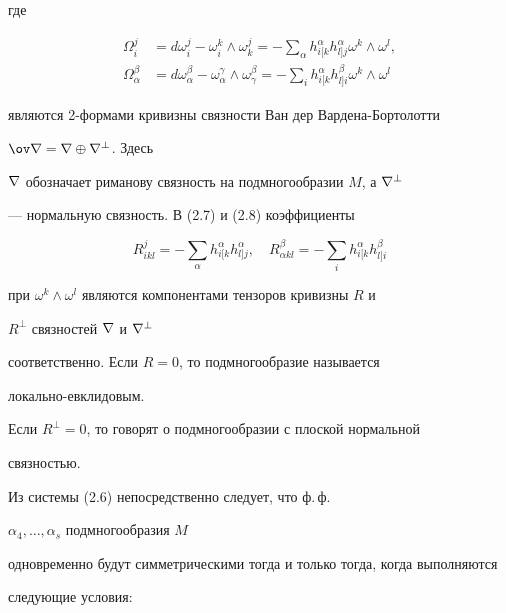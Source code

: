где 


\begin{align} 


\Omega^j_i&=d\omega^j_i-\omega^k_i\wedge\omega^j_k= 


-\sum_\alpha h^\alpha_{i[k}h^\alpha_{l]j}\omega^k\wedge\omega^l,\\ 


\Omega^\beta_\alpha&=d\omega^\beta_\alpha- 


\omega^\gamma_\alpha\wedge\omega^\beta_\gamma= 


-\sum_i h^\alpha_{i[k}h^\beta_{l]i}\omega^k\wedge\omega^l 


\end{align} 


являются 2-формами кривизны связности Ван дер Вардена-Бортолотти 


$\ov\na=\na\oplus\na^\bot$. Здесь 


$\nabla$ обозначает риманову связность на подмногообразии $M$, а $\nabla^\bot$ 


--- нормальную связность. В (2.7) и (2.8) коэффициенты 


\begin{equation} 


R^j_{ikl}=-\sum_\alpha h^\alpha_{i[k}h^\alpha_{l]j},\quad 


R^\beta_{\alpha kl}=-\sum_i h^\alpha_{i[k}h^\beta_{l]i} 


\end{equation} 


при $\omega^k\wedge\omega^l$ являются компонентами тензоров кривизны $R$ и 


$R^\bot$ связностей $\nabla$ и $\nabla^\bot$ 


соответственно. Если $R=0$, то подмногообразие называется 


локально-евклидовым. 


Если $R^\bot=0$, то говорят о подмногообразии с плоской нормальной 


связностью. 


 


Из системы (2.6) непосредственно следует, что ф.\,ф. 


$\alpha_4,\dotsc,\alpha_s$ подмногообразия $M$ 


одновременно будут симметрическими тогда и только тогда, когда выполняются 


следующие условия: 


